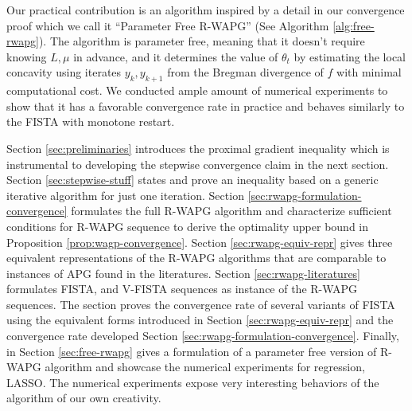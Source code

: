 \documentclass[12pt]{article}
\begin{document}
        \par
        Our practical contribution is an algorithm inspired by a detail in our convergence proof which we call it ``Parameter Free R-WAPG'' (See Algorithm \ref{alg:free-rwapg}). 
        The algorithm is parameter free, meaning that it doesn't require knowing $L, \mu$ in advance, and it determines the value of $\theta_t$ by estimating the local concavity using iterates $y_{k}, y_{k + 1}$ from the Bregman divergence of $f$ with minimal computational cost. 
        We conducted ample amount of numerical experiments to show that it has a favorable convergence rate in practice and behaves similarly to the FISTA with monotone restart.
        \par
        Section \ref{sec:preliminaries} introduces the proximal gradient inequality which is instrumental to developing the stepwise convergence claim in the next section. 
        Section \ref{sec:stepwise-stuff} states and prove an inequality based on a generic iterative algorithm for just one iteration. 
        Section \ref{sec:rwapg-formulation-convergence} formulates the full R-WAPG algorithm and characterize sufficient conditions for R-WAPG sequence to derive the optimality upper bound in Proposition \ref{prop:wagp-convergence}. 
        Section \ref{sec:rwapg-equiv-repr} gives three equivalent representations of the R-WAPG algorithms that are comparable to instances of APG found in the literatures. 
        Section \ref{sec:rwapg-literatures} formulates FISTA, and V-FISTA sequences as instance of the R-WAPG sequences.
        The section proves the convergence rate of several variants of FISTA using the equivalent forms introduced in Section \ref{sec:rwapg-equiv-repr} and the convergence rate developed Section \ref{sec:rwapg-formulation-convergence}. 
        Finally, in Section \ref{sec:free-rwapg} gives a formulation of a parameter free version of R-WAPG algorithm and showcase the numerical experiments for regression, LASSO. 
        The numerical experiments expose very interesting behaviors of the algorithm of our own creativity. 
\end{document}
